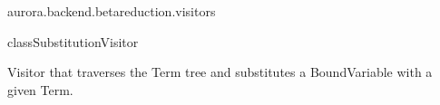 \begin{texdocpackage}{aurora.backend.betareduction.visitors}
\begin{texdocclass}{class}{SubstitutionVisitor}
\label{texdoclet:aurora.backend.betareduction.visitors.SubstitutionVisitor}
\begin{texdocclassintro}
Visitor that traverses the Term tree and substitutes a BoundVariable with a given Term.\end{texdocclassintro}
\begin{texdocclassconstructors}
\end{texdocclassconstructors}
\begin{texdocclassmethods}
\end{texdocclassmethods}
\end{texdocclass}


\end{texdocpackage}



